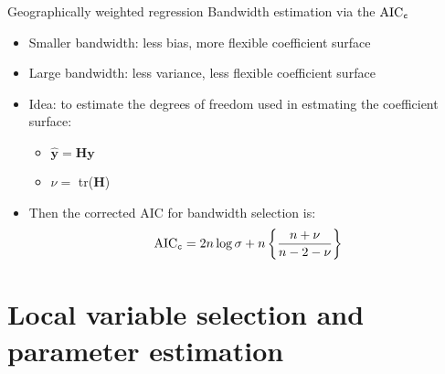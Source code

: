 \documentclass[12pt,t]{beamer}
\newcommand{\subt}[1]{{\footnotesize \color{subtitle} {#1}}}
\begin{document}
\begin{frame}{Geographically weighted regression}
\subt{Bandwidth estimation via the $\text{AIC}_{\tt c}$ \citep{Hurvich:1998}}

\bigskip
\begin{itemize}
    \item Smaller bandwidth: less bias, more flexible coefficient surface
    \item Large bandwidth: less variance, less flexible coefficient surface
    \item Idea: to estimate the degrees of freedom used in estmating the coefficient surface:
    \begin{itemize}
        \item $\hat{\bm{y}} = \bm{H}\bm{y}$
        \item $\nu = $ tr($\bm{H}$)
    \end{itemize}
    \item Then the corrected AIC for bandwidth selection is:
      \begin{align*}
        \text{AIC}_{\tt c} = 2 n \log{\sigma} + n \left\{\frac{n + \nu}{n - 2 - \nu}\right\}
      \end{align*}
\end{itemize}

\end{frame}







\section{Local variable selection and parameter estimation}
\end{document}
